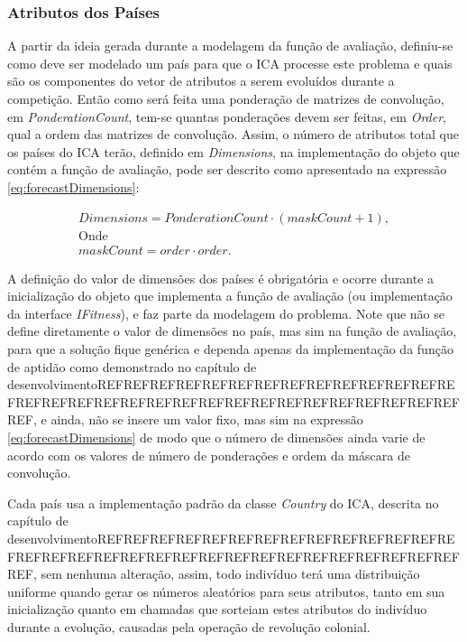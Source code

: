 \subsubsection{Atributos dos Países}
\label{Atributos dos Países}

A partir da ideia gerada durante a modelagem da função de avaliação, definiu-se como deve ser modelado um país para que o ICA processe este problema e quais são os componentes do vetor de atributos a serem evoluídos durante a competição. Então como será feita uma ponderação de matrizes de convolução, em \emph{PonderationCount}, tem-se quantas ponderações devem ser feitas, em \emph{Order}, qual a ordem das matrizes de convolução. Assim, o número de atributos total que os países do ICA terão, definido em \emph{Dimensions}, na implementação do objeto que contém a função de avaliação, pode ser descrito como apresentado na expressão \ref{eq:forecastDimensions}: 
	
\begin{equation}
\label{eq:forecastDimensions}
\begin{split}
Dimensions = PonderationCount \cdot (maskCount + 1), 
\\\text{Onde}
\\maskCount = order \cdot order.
\end{split}
\end{equation}

A definição do valor de dimensões dos países é obrigatória e ocorre durante a inicialização do objeto que implementa a função de  avaliação (ou implementação da interface \emph{IFitness}), e faz parte da modelagem do problema. Note que não se define diretamente o valor de dimensões no país, mas sim na função de avaliação, para  que a solução fique genérica e dependa apenas da implementação da função de aptidão como demonstrado no capítulo de desenvolvimentoREFREFREFREFREFREFREFREFREFREFREFREFREFREFREFREFREFREFREFREFREFREFREFREFREFREFREFREFREFREFREFREF, e ainda, não se insere um valor fixo, mas sim na expressão \ref{eq:forecastDimensions} de modo que o número de dimensões ainda varie de acordo com os valores de número de ponderações e ordem da máscara de convolução.

	Cada país usa a implementação padrão da classe \emph{Country} do ICA, descrita no capítulo de desenvolvimentoREFREFREFREFREFREFREFREFREFREFREFREFREFREFREFREFREFREFREFREFREFREFREFREFREFREFREFREFREFREFREFREF, sem nenhuma alteração, assim, todo indivíduo terá uma distribuição uniforme quando gerar os números aleatórios para seus atributos, tanto em sua inicialização quanto em chamadas que sorteiam estes atributos do indivíduo durante a evolução, causadas pela operação de revolução colonial.


